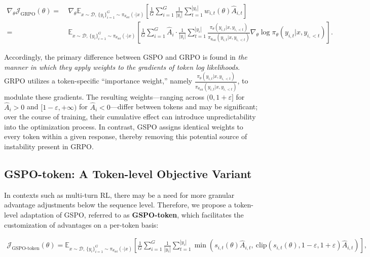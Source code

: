 \begin{align}
\nabla_{\theta} \mathcal{J}_\text{GRPO} (\theta) 
=&\ 
\nabla_{\theta} \mathbb{E}_{ x \sim \mathcal{D},\, \{y_i\}_{i=1}^G \sim \pi_{\theta_\text{old}}( \cdot | x) }
\left[ \frac{1}{G} \sum_{i=1}^{G} \frac{1}{|y_i|} \sum_{t=1}^{|y_i|} 
w_{i,t}(\theta) \widehat{A}_{i,t}
\right] \\
=&\
\mathbb{E}_{ x \sim \mathcal{D},\, \{y_i\}_{i=1}^G \sim \pi_{\theta_\text{old}}( \cdot | x) }
\left[ \frac{1}{G} \sum_{i=1}^{G} \widehat{A}_{i} 
\cdot \frac{1}{|y_i|} \sum_{t=1}^{|y_i|} 
\frac{ \pi_{\theta} (y_{i,t} | x, y_{i,<t}) }{ \pi_{\theta_\text{old}} (y_{i,t} | x,y_{i,<t})} 
\nabla_{\theta} \log \pi_{\theta} (y_{i,t} | x, y_{i,<t})  
\right].
\end{align}

Accordingly, the primary difference between GSPO and GRPO is found in \textit{the manner in which they apply weights to the gradients of token log likelihoods}. GRPO utilizes a token-specific “importance weight,” namely $\frac{ \pi_{\theta} (y_{i,t} | x, y_{i,<t}) }{ \pi_{\theta_\text{old}} (y_{i,t} | x,y_{i,<t})}$, to modulate these gradients. The resulting weights—ranging across $(0, 1+\varepsilon]$ for $\widehat{A}_{i} >0$ and $[1-\varepsilon, +\infty)$ for $\widehat{A}_{i} < 0$—differ between tokens and may be significant; over the course of training, their cumulative effect can introduce unpredictability into the optimization process. In contrast, GSPO assigns identical weights to every token within a given response, thereby removing this potential source of instability present in GRPO.

\subsection{GSPO-token: A Token-level Objective Variant}

In contexts such as multi-turn RL, there may be a need for more granular advantage adjustments below the sequence level. Therefore, we propose a token-level adaptation of GSPO, referred to as \textbf{GSPO-token}, which facilitates the customization of advantages on a per-token basis:

\begin{align}
\mathcal{J}_\text{GSPO-token}(\theta)
=
\mathbb{E}_{ x \sim \mathcal{D},\, \{y_i\}_{i=1}^G \sim \pi_{\theta_\text{old}}( \cdot | x) }
\left[
\frac{1}{G} \sum_{i=1}^{G} \frac{1}{|y_i|} \sum_{t=1}^{|y_i|}
\min \left(
s_{i,t}(\theta) \widehat{A}_{i,t}, \ 
\mathrm{clip}\left( s_{i,t}(\theta), 1 - {\varepsilon}, 1 + {\varepsilon} \right) \widehat{A}_{i,t}
\right)
\right],
\label{equ:gspo-token}
\end{align}

